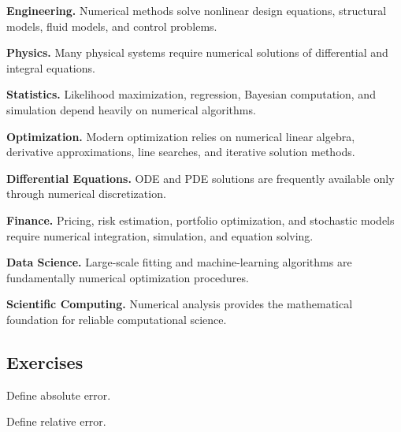 \begin{applicationbox}

\textbf{Engineering.}
Numerical methods solve nonlinear design equations, structural models,
fluid models, and control problems.

\medskip

\textbf{Physics.}
Many physical systems require numerical solutions of differential and
integral equations.

\medskip

\textbf{Statistics.}
Likelihood maximization, regression, Bayesian computation, and simulation
depend heavily on numerical algorithms.

\medskip

\textbf{Optimization.}
Modern optimization relies on numerical linear algebra, derivative
approximations, line searches, and iterative solution methods.

\medskip

\textbf{Differential Equations.}
ODE and PDE solutions are frequently available only through numerical
discretization.

\medskip

\textbf{Finance.}
Pricing, risk estimation, portfolio optimization, and stochastic models
require numerical integration, simulation, and equation solving.

\medskip

\textbf{Data Science.}
Large-scale fitting and machine-learning algorithms are fundamentally
numerical optimization procedures.

\medskip

\textbf{Scientific Computing.}
Numerical analysis provides the mathematical foundation for reliable
computational science.

\end{applicationbox}

\subsection{Exercises}
\label{subsec:numerical-analysis-exercises}

\begin{exercise}[1]
Define absolute error.
\end{exercise}

\begin{exercise}[1]
Define relative error.
\end{exercise}

